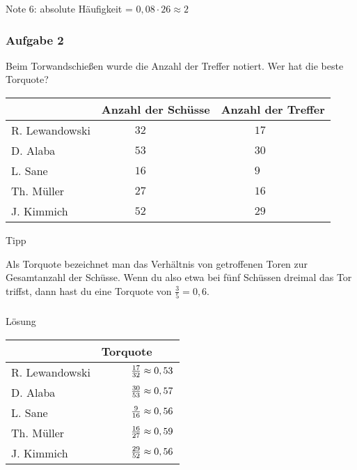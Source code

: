 \documentclass[
  ngerman,
]{book}
\begin{document}
Note 6: absolute Häufigkeit = \(0,08 \cdot 26 \approx 2\)

\hypertarget{section-9}{%
\subsubsection*{}\label{section-9}}

\hypertarget{aufgabe-2-1}{%
\subsubsection*{Aufgabe 2}\label{aufgabe-2-1}}

Beim Torwandschießen wurde die Anzahl der Treffer notiert. Wer hat die beste Torquote?

\begin{longtable}[]{@{}lll@{}}
\toprule
& Anzahl der Schüsse & Anzahl der Treffer\tabularnewline
\midrule
\endhead
R. Lewandowski & \(\quad\quad\quad 32\) & \(\quad\quad\quad 17\)\tabularnewline
D. Alaba & \(\quad\quad\quad 53\) & \(\quad\quad\quad 30\)\tabularnewline
L. Sane & \(\quad\quad\quad 16\) & \(\quad\quad\quad 9\)\tabularnewline
Th. Müller & \(\quad\quad\quad 27\) & \(\quad\quad\quad 16\)\tabularnewline
J. Kimmich & \(\quad\quad\quad 52\) & \(\quad\quad\quad 29\)\tabularnewline
\bottomrule
\end{longtable}

Tipp

Als Torquote bezeichnet man das Verhältnis von getroffenen Toren zur Gesamtanzahl der Schüsse. Wenn du also etwa bei fünf Schüssen dreimal das Tor triffst, dann hast du eine Torquote von \(\frac{3}{5}=0,6\).

\hypertarget{section-10}{%
\subsubsection*{}\label{section-10}}

Lösung

\begin{longtable}[]{@{}ll@{}}
\toprule
& Torquote\tabularnewline
\midrule
\endhead
R. Lewandowski & \(\quad\quad\quad {17 \over 32} \approx 0,53\)\tabularnewline
D. Alaba & \(\quad\quad\quad {30 \over 53} \approx 0,57\)\tabularnewline
L. Sane & \(\quad\quad\quad {9 \over 16} \approx 0,56\)\tabularnewline
Th. Müller & \(\quad\quad\quad {16 \over 27} \approx 0,59\)\tabularnewline
J. Kimmich & \(\quad\quad\quad {29 \over 52} \approx 0,56\)\tabularnewline
\bottomrule
\end{longtable}
\end{document}
